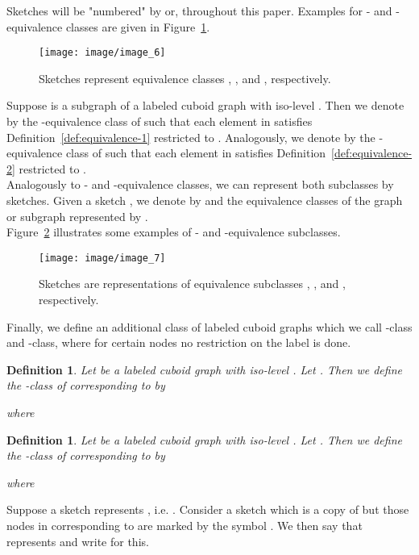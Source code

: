 \documentclass[a4paper,11pt]{article}
\newtheorem{definition}[theorem]{Definition}
\begin{document}
Sketches will be "numbered" by  or,  throughout this paper. Examples
for - and -equivalence classes are given in Figure~\ref{image_6}.
\begin{figure}[!ht]
\texttt{[image: image/image\_6]}
\caption{Sketches  represent equivalence classes ,
,  and , respectively.}
\label{image_6}
\end{figure}
\FloatBarrier

Suppose  is a subgraph of
a labeled cuboid graph  with iso-level . Then we denote by
 the -equivalence class of  such that each element
in  satisfies Definition~\ref{def:equivalence-1} restricted
to . Analogously, we denote by  the
-equivalence class of  such that each element in 
satisfies Definition~\ref{def:equivalence-2} restricted to .\\

Analogously to
- and -equivalence classes, we can represent both subclasses by sketches.
Given a sketch , we denote by  and  the equivalence
classes of the graph or subgraph represented by .\\

\noindent Figure~\ref{image_7} illustrates some examples of - and -equivalence
subclasses.
\begin{figure}[!ht]
\texttt{[image: image/image\_7]}
\caption{Sketches  are representations of equivalence subclasses
, ,  and , respectively.}
\label{image_7}
\end{figure}
\FloatBarrier

Finally, we define an additional class of labeled cuboid graphs which we call -class and
-class, where for certain nodes no restriction on the label is done.
\begin{definition}
Let  be a labeled cuboid graph with iso-level . Let
. Then we define the -class of  corresponding to  by

where

\label{def:equivalence-3}
\end{definition}

\begin{definition}
Let  be a labeled cuboid graph with iso-level . Let .
Then we define the -class of  corresponding to  by

where

\label{def:equivalence-4}
\end{definition}

Suppose a sketch  represents
, i.e. . Consider a sketch
 which is a copy of  but those nodes in  corresponding to 
are marked by the symbol . We then say that  represents  and write  for this. \\
\end{document}
